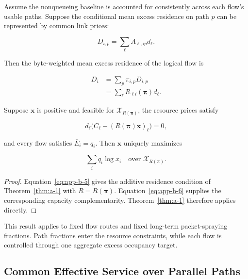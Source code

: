 Assume the nonqueueing baseline is accounted for consistently across each flow's usable paths. Suppose the conditional mean excess residence on path \(p\) can be represented by common link prices:

\begin{equation}
\label{eq:app-b-4}
D_{i,p}=\sum_\ell A_{\ell,ip}d_\ell.
\end{equation}

Then the byte-weighted mean excess residence of the logical flow is

\begin{equation}
\label{eq:app-b-5}
\begin{aligned}
D_i
&=\sum_p\pi_{i,p}D_{i,p}\\
&=\sum_\ell R_{\ell i}(\boldsymbol\pi)d_\ell.
\end{aligned}
\end{equation}

\begin{theorem}
\label{thm:b-1}
Suppose \(\mathbf x\) is positive and feasible for \(\mathcal X_{R(\boldsymbol\pi)}\), the resource prices satisfy

\begin{equation}
\label{eq:app-b-6}
d_\ell
\big(C_\ell-(R(\boldsymbol\pi)\mathbf x)_\ell\big)=0,
\end{equation}

and every flow satisfies \(\overline E_i=q_i\). Then \(\mathbf x\) uniquely maximizes

\begin{equation}
\label{eq:app-b-7}
\sum_iq_i\log x_i
\quad\text{over }\mathcal X_{R(\boldsymbol\pi)}.
\end{equation}
\end{theorem}

\begin{proof} Equation~\eqref{eq:app-b-5} gives the additive residence condition of Theorem~\ref{thm:a-1} with \(R=R(\boldsymbol\pi)\). Equation~\eqref{eq:app-b-6} supplies the corresponding capacity complementarity. Theorem~\ref{thm:a-1} therefore applies directly.
\end{proof}

This result applies to fixed flow routes and fixed long-term packet-spraying fractions. Path fractions enter the resource constraints, while each flow is controlled through one aggregate excess occupancy target.

\subsection{Common Effective Service over Parallel Paths}
\label{app:b-2}

